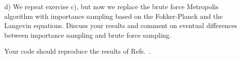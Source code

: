 \begin{prob}
\begin{enumerate}
\item[d)] We repeat exercise c), but now we replace the brute force Metropolis algorithm with 
importance sampling based on the Fokker-Planck and the Langevin equations. 
Discuss your results and comment on eventual differences between importance sampling and brute force sampling.

Your code should reproduce the results of Refs.~\cite{dubois2001,nilsen2005}.

\end{enumerate}

\end{prob}




 
